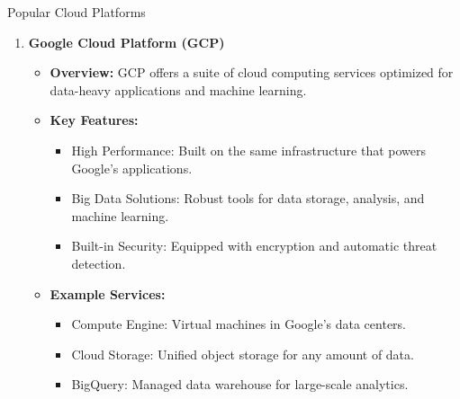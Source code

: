 \documentclass[aspectratio=169]{beamer}
\begin{document}
\begin{frame}[fragile]
\begin{block}{Popular Cloud Platforms}
\begin{enumerate}
            \item \textbf{Google Cloud Platform (GCP)}
                \begin{itemize}
                    \item \textbf{Overview:} GCP offers a suite of cloud computing services optimized for data-heavy applications and machine learning.
                    \item \textbf{Key Features:}
                        \begin{itemize}
                            \item High Performance: Built on the same infrastructure that powers Google’s applications.
                            \item Big Data Solutions: Robust tools for data storage, analysis, and machine learning.
                            \item Built-in Security: Equipped with encryption and automatic threat detection.
                        \end{itemize}
                    \item \textbf{Example Services:}
                        \begin{itemize}
                            \item Compute Engine: Virtual machines in Google’s data centers.
                            \item Cloud Storage: Unified object storage for any amount of data.
                            \item BigQuery: Managed data warehouse for large-scale analytics.
                        \end{itemize}
                \end{itemize}
        \end{enumerate}
    \end{block}
\end{frame}
\end{document}
